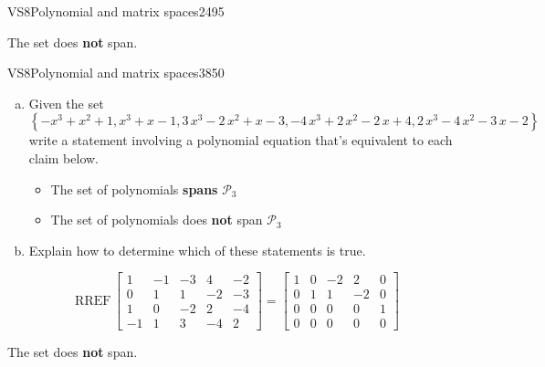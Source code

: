 \begin{exercise}{VS8}{Polynomial and matrix spaces}{2495}
\begin{exerciseAnswer}
 

 The set does \textbf{not} span. 

 \end{exerciseAnswer}
 \end{exercise}


\begin{exercise}{VS8}{Polynomial and matrix spaces}{3850} 
\begin{exerciseStatement} 

\begin{enumerate}[(a)]
\item  

 Given the set \[\left\{ -x^{3} + x^{2} + 1 , x^{3} + x - 1 , 3 \, x^{3} - 2 \, x^{2} + x - 3 , -4 \, x^{3} + 2 \, x^{2} - 2 \, x + 4 , 2 \, x^{3} - 4 \, x^{2} - 3 \, x - 2 \right\}\] write a statement involving a polynomial equation that's equivalent to each claim below. 

 

\begin{itemize}
\item  

 The set of polynomials \textbf{spans} \(\mathcal{P}_3\) 

 
\item  

 The set of polynomials does \textbf{not} span \(\mathcal{P}_3\) 

 
\end{itemize}

     
\item  

 Explain how to determine which of these statements is true. 

 
\end{enumerate}

     \end{exerciseStatement}
 \begin{exerciseAnswer} 

 \[
\mathrm{RREF}\, \left[\begin{array}{ccccc}
1 & -1 & -3 & 4 & -2 \\
0 & 1 & 1 & -2 & -3 \\
1 & 0 & -2 & 2 & -4 \\
-1 & 1 & 3 & -4 & 2
\end{array}\right] = \left[\begin{array}{ccccc}
1 & 0 & -2 & 2 & 0 \\
0 & 1 & 1 & -2 & 0 \\
0 & 0 & 0 & 0 & 1 \\
0 & 0 & 0 & 0 & 0
\end{array}\right]
            \] 

 

 The set does \textbf{not} span. 

 \end{exerciseAnswer}
 \end{exercise}


